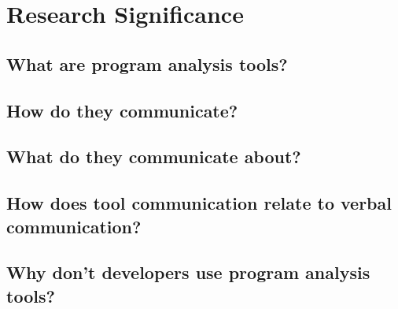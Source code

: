 \documentclass{llncs}
\begin{document}
\section{Research Significance}

\subsection{What are program analysis tools?}

\subsection{How do they communicate?}

\subsection{What do they communicate about?}


\subsection{How does tool communication relate to verbal communication?}

\subsection{Why don't developers use program analysis tools?}
\end{document}
